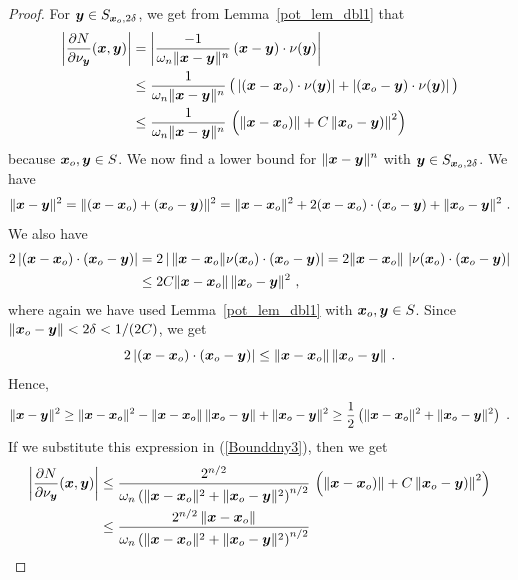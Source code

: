 \begin{proof}
For ${\bm{y}} \in S_{{\bm{x}}_o,2\delta}$, we get from
Lemma~\ref{pot_lem_dbl1} that
\begin{align}
\left| \frac{\partial{N}}{\partial \nu_{{\bm{y}}}}({\bm{x}},{\bm{y}})\right| 
&= \left| \frac{-1}{\omega_n \|{\bm{x}}-{\bm{y}}\|^n}\,({\bm{x}}-{\bm{y}})
\cdot \nu({\bm{y}}) \right| \nonumber \\
&\leq \frac{1}{\omega_n \|{\bm{x}}-{\bm{y}}\|^n}\,\big(
\left|({\bm{x}}-{\bm{x}}_o) \cdot \nu({\bm{y}}) \right|
+ \left| ({\bm{x}}_o-{\bm{y}}) \cdot \nu({\bm{y}}) \right| \big)
\nonumber \\
&\leq \frac{1}{\omega_n \|{\bm{x}}-{\bm{y}}\|^n}\,\left(
\left\|{\bm{x}}-{\bm{x}}_o) \right\|
+ C \left\| {\bm{x}}_o-{\bm{y}}) \right\|^2 \right)
\label{Bounddny3}
\end{align}
because ${\bm{x}}_o, {\bm{y}} \in S$.  We now find a lower bound for
$\displaystyle \|{\bm{x}}-{\bm{y}}\|^n$ with ${\bm{y}} \in S_{{\bm{x}}_o,2\delta}$.
We have
\[
\|{\bm{x}}-{\bm{y}}\|^2 = \| ({\bm{x}}-{\bm{x}}_o) + ({\bm{x}}_o-{\bm{y}})\|^2
= \|{\bm{x}}-{\bm{x}}_o\|^2 + 2 ({\bm{x}}-{\bm{x}}_o) \cdot ({\bm{x}}_o-{\bm{y}})
+ \|{\bm{x}}_o-{\bm{y}}\|^2 \ .
\]
We also have
\begin{align*}
2\left| ({\bm{x}} - {\bm{x}}_o) \cdot ({\bm{x}}_o - {\bm{y}}) \right|
&= 2\left|\, \|{\bm{x}} - {\bm{x}}_o\| \nu({\bm{x}}_o)
\cdot ({\bm{x}}_o - {\bm{y}}) \right|
= 2\|{\bm{x}} - {\bm{x}}_o\|\, \left|\nu({\bm{x}}_o)
\cdot ({\bm{x}}_o - {\bm{y}}) \right| \\
&\leq 2 C \|{\bm{x}} - {\bm{x}}_o\| \, \|{\bm{x}}_o - {\bm{y}}\|^2 \ ,
\end{align*}
where again we have used Lemma~\ref{pot_lem_dbl1} with
${\bm{x}}_o, {\bm{y}} \in S$.  Since
$\|{\bm{x}}_o - {\bm{y}}\| < 2\delta < 1/(2C)$, we get
\[
2\left| ({\bm{x}} - {\bm{x}}_o) \cdot ({\bm{x}}_o - {\bm{y}}) \right|
\leq \|{\bm{x}} - {\bm{x}}_o\| \, \|{\bm{x}}_o - {\bm{y}}\| \ .
\]
Hence,
\[
\|{\bm{x}}-{\bm{y}}\|^2 \geq \|{\bm{x}}-{\bm{x}}_o\|^2
- \|{\bm{x}} - {\bm{x}}_o\| \, \|{\bm{x}}_o - {\bm{y}}\| + \|{\bm{x}}_o-{\bm{y}}\|^2
\geq \frac{1}{2} \left( \|{\bm{x}}-{\bm{x}}_o\|^2
+ \|{\bm{x}}_o-{\bm{y}}\|^2 \right) \ .
\]
If we substitute this expression in (\ref{Bounddny3}), then we get
\begin{align*}
\left| \pdydx{N}{\nu_{\VEC{y}}}(\VEC{x},\VEC{y})\right| 
&\leq \frac{2^{n/2}}{\omega_n \left(\|\VEC{x}-\VEC{x}_o\|^2 +
    \|\VEC{x}_o-\VEC{y}\|^2\right)^{n/2}}\,\left(
\left\|\VEC{x}-\VEC{x}_o) \right\|
  + C \left\| \VEC{x}_o-\VEC{y}) \right\|^2 \right) \\
&\leq \frac{2^{n/2} \left\|\VEC{x}-\VEC{x}_o\right\|}
{\omega_n \left(\|\VEC{x}-\VEC{x}_o\|^2 +
\|\VEC{x}_o-\VEC{y}\|^2\right)^{n/2}}

\end{align*}
\end{proof}
